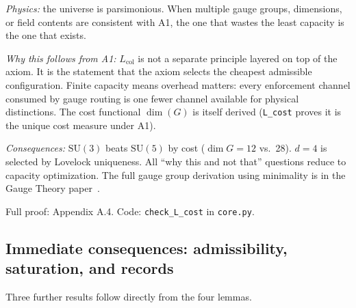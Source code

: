 \documentclass[11pt]{article}
\newcommand{\SU}{\mathrm{SU}}
\begin{document}
\textit{Physics:} the universe is parsimonious.  When multiple gauge groups, dimensions, or field contents are consistent with A1, the one that wastes the least capacity is the one that exists.

\textit{Why this follows from A1:} $L_{\mathrm{col}}$ is not a separate principle layered on top of the axiom.  It is the statement that the axiom selects the cheapest admissible configuration.  Finite capacity means overhead matters: every enforcement channel consumed by gauge routing is one fewer channel available for physical distinctions.  The cost functional $\dim(G)$ is itself derived (\texttt{L\_cost} proves it is the unique cost measure under A1).

\textit{Consequences:} $\SU(3)$ beats $\SU(5)$ by cost ($\dim G = 12$ vs.\ 28).  $d = 4$ is selected by Lovelock uniqueness.  All ``why this and not that'' questions reduce to capacity optimization.  The full gauge group derivation using minimality is in the Gauge Theory paper~\cite{PGT}.

Full proof: Appendix A.4.  Code: \texttt{check\_L\_cost} in \texttt{core.py}.


\subsection{Immediate consequences: admissibility, saturation, and records}

Three further results follow directly from the four lemmas.
\end{document}
